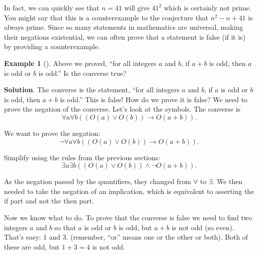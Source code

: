 \documentclass[10pt,]{book}
\theoremstyle{plain}
\theoremstyle{definition}
\theoremstyle{definition}
\newtheorem{example}[theorem]{Example}
\theoremstyle{definition}
\theoremstyle{definition}
\numberwithin{equation}{chapter}
\def\imp{\rightarrow}
\begin{document}
\par
\hypertarget{p-1984}{}%
In fact, we can quickly see that \(n = 41\) will give \(41^2\) which is certainly not prime. You might say that this is a counterexample to the conjecture that \(n^2 - n + 41\) is always prime. Since so many statements in mathematics are universal, making their negations existential, we can often prove that a statement is false (if it is) by providing a counterexample.%
\begin{example}[]\label{example-72}
\hypertarget{p-1985}{}%
Above we proved, ``for all integers \(a\) and \(b\), if \(a+b\) is odd, then \(a\) is odd or \(b\) is odd.'' Is the converse true?%
\par\smallskip%
\noindent\textbf{Solution}.\hypertarget{solution-187}{}\quad%
\hypertarget{p-1986}{}%
The converse is the statement, ``for all integers \(a\) and \(b\), if \(a\) is odd or \(b\) is odd, then \(a + b\) is odd.'' This is false! How do we prove it is false? We need to prove the negation of the converse. Let's look at the symbols. The converse is%
\begin{equation*}
\forall a \forall b ((O(a) \vee O(b)) \imp O(a+b)).
\end{equation*}
%
\par
\hypertarget{p-1987}{}%
We want to prove the negation:%
\begin{equation*}
\neg \forall a \forall b ((O(a) \vee O(b)) \imp O(a+b)).
\end{equation*}
%
\par
\hypertarget{p-1988}{}%
Simplify using the rules from the previous sections:%
\begin{equation*}
\exists a \exists b ((O(a) \vee O(b)) \wedge \neg O(a+b)).
\end{equation*}
%
\par
\hypertarget{p-1989}{}%
As the negation passed by the quantifiers, they changed from \(\forall\) to \(\exists\). We then needed to take the negation of an implication, which is equivalent to asserting the if part and not the then part.%
\par
\hypertarget{p-1990}{}%
Now we know what to do. To prove that the converse is false we need to find two integers \(a\) and \(b\) so that \(a\) is odd or \(b\) is odd, but \(a+b\) is not odd (so even). That's easy: 1 and 3. (remember, ``or'' means one or the other or both). Both of these are odd, but \(1+3 = 4\) is not odd.%
\end{example}
\typeout{************************************************}
\typeout{************************************************}
\end{document}
